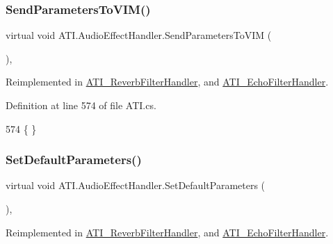 \subsubsection{\texorpdfstring{Send\+Parameters\+To\+V\+I\+M()}{SendParametersToVIM()}}
{\footnotesize\ttfamily virtual void A\+T\+I.\+Audio\+Effect\+Handler.\+Send\+Parameters\+To\+V\+IM (\begin{DoxyParamCaption}{ }\end{DoxyParamCaption})\hspace{0.3cm}{\ttfamily [protected]}, {\ttfamily [virtual]}}



Reimplemented in \hyperlink{class_a_t_i___reverb_filter_handler_aacb469dc3038fca616d638f6a5a04a30}{A\+T\+I\+\_\+\+Reverb\+Filter\+Handler}, and \hyperlink{class_a_t_i___echo_filter_handler_afacef95c6ac470707d2bd092031efac0}{A\+T\+I\+\_\+\+Echo\+Filter\+Handler}.



Definition at line 574 of file A\+T\+I.\+cs.


\begin{DoxyCode}
574 \{ \}
\end{DoxyCode}
\mbox{\label{class_a_t_i_1_1_audio_effect_handler_a9f2b5ce4ce7b2e3a7cca147a87733a77}} 
\subsubsection{\texorpdfstring{Set\+Default\+Parameters()}{SetDefaultParameters()}}
{\footnotesize\ttfamily virtual void A\+T\+I.\+Audio\+Effect\+Handler.\+Set\+Default\+Parameters (\begin{DoxyParamCaption}{ }\end{DoxyParamCaption})\hspace{0.3cm}{\ttfamily [protected]}, {\ttfamily [virtual]}}



Reimplemented in \hyperlink{class_a_t_i___reverb_filter_handler_a69a75dcda06ae1597030e0ceaf84e1ae}{A\+T\+I\+\_\+\+Reverb\+Filter\+Handler}, and \hyperlink{class_a_t_i___echo_filter_handler_a55aed0339fe1f3cdbea2b810a2d74cd4}{A\+T\+I\+\_\+\+Echo\+Filter\+Handler}.




